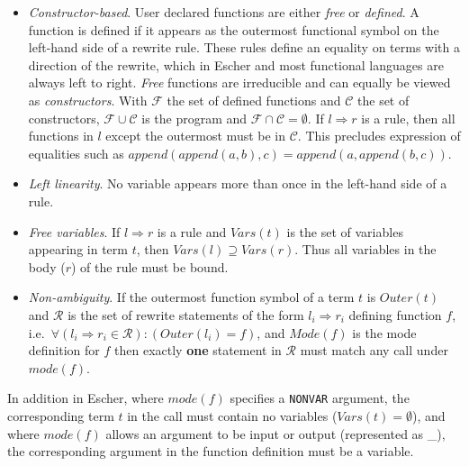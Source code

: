 \begin{itemize}

\item{\textit{Constructor-based}. 
  User declared functions are either \textit{free} or \textit{defined}.  A function is defined if
  it appears as the outermost functional symbol on the left-hand side of a rewrite rule.
  These rules define an equality on terms
  with a direction of the rewrite, which in Escher and most functional languages are
  always left to right.
  \textit{Free} functions are irreducible and can
  equally be viewed as \textit{constructors}.  With $\mathcal{F}$ the set of defined functions
  and $\mathcal{C}$
  the set of constructors, $\mathcal{F} \cup \mathcal{C}$ is the program and
  $\mathcal{F} \cap \mathcal{C} = \emptyset$.
  If $l \Rightarrow r$ is a rule, then all
  functions in $l$ except the outermost must be in $\mathcal{C}$.
  This precludes expression of equalities such as
  $\mathit{append}(\mathit{append}(a,b),c) = \mathit{append}(a,\mathit{append}(b,c))$.
  }
\item{\textit{Left linearity}.
  No variable appears more than once in the left-hand side of a rule.
  }
\item{\textit{Free variables}.  If $l \Rightarrow r$ is a rule and $Vars(t)$ is the set of
  variables appearing in term $t$, then $\mathit{Vars}(l) \supseteq \mathit{Vars}(r)$.
  Thus all variables in the
  body ($r$) of the rule must be bound.
  }
\item{\textit{Non-ambiguity}.  
  If the outermost function symbol of a term $t$ is $\mathit{Outer}(t)$ and
  $\mathcal{R}$ is the set of rewrite statements of the form
  $l_i \Rightarrow r_i$ defining function $f$, i.e.\ $\forall (l_i \Rightarrow r_i \in
  \mathcal{R}): (\mathit{Outer}(l_i) = f)$, and $\mathit{Mode}(f)$ is the mode definition for
  $f$ then exactly \textbf{one} statement in $\mathcal{R}$ must match any call under
  $mode(f)$.
  }

\end{itemize}

In addition in Escher,  where $\mathit{mode}(f)$ specifies a \texttt{NONVAR} argument, the
corresponding term $t$ in the call must contain no variables ($\mathit{Vars}(t) = \emptyset$),
and where $\mathit{mode}(f)$ allows an argument to be input or output (represented as \_), the
corresponding argument in the function definition must be a variable.

